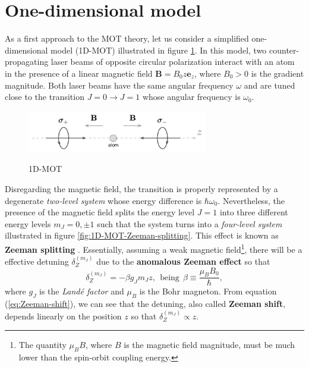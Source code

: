 %
\section{One-dimensional model}
\label{eq:one-dimensional-model}
%

As a first approach to the MOT theory, let us consider a simplified one-dimensional model (1D-MOT) illustrated in figure \ref{fig:1D-MOT}. In this model, two counter-propagating laser beams of opposite circular polarization interact with an atom in the presence of a linear magnetic field $ \mathbf{B} = B_0 z \mathbf{e}_z $, where $ B_0 > 0 $ is the gradient magnitude. Both laser beams have the same angular frequency $ \omega $ and are tuned close to the transition $ J = 0 \rightarrow J = 1 $ whose angular frequency is $ \omega_0 $.

\begin{figure}[!ht]
	\centering
	\caption{1D-MOT}
	\includegraphics[width=0.7\textwidth]{USPSC-img/1D-MOT.png}
	\vspace{5pt}
	\label{fig:1D-MOT}
	\vspace{-10pt}
\end{figure}

Disregarding the magnetic field, the transition is properly represented by a degenerate \textit{two-level system} whose energy difference is $ \hbar \omega_0 $. Nevertheless, the presence of the magnetic field splits the energy level $ J = 1 $ into three different energy levels $ m_J = 0, \pm 1 $ such that the system turns into a \textit{four-level system} illustrated in figure \ref{fig:1D-MOT-Zeeman-splitting}. This effect is known as \textbf{Zeeman splitting} \cite[Section~7.4]{steck2007quantum}. Essentially, assuming a weak magnetic field\footnote{The quantity $ \mu_B B $, where $ B $ is the magnetic field magnitude, must be much lower than the spin-orbit coupling energy.}, there will be a effective detuning $ \delta_Z^{(m_J)} $ due to the \textbf{anomalous Zeeman effect} so that
\begin{equation}
	\delta_Z^{(m_J)} = - \beta g_{J} m_J z,\ \ \textrm{being}\ \ \beta \equiv \frac{\mu_B B_0}{\hbar},
	\label{eq:Zeeman-shift}
\end{equation}
where $ g_J $ is the \textit{Landé factor} and $ \mu_B $ is the Bohr magneton. From equation (\ref{eq:Zeeman-shift}), we can see that the detuning, also called \textbf{Zeeman shift}, depends linearly on the position $ z $ so that $ \delta_Z^{(m_J)} \propto z $.

